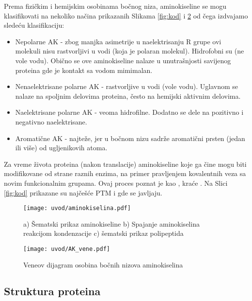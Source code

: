 Prema fizičkim i hemijskim osobinama bočnog niza, aminokiseline se mogu
klasifikovati na nekoliko načina prikazanih Slikama \ref{fig:kod} i
\ref{fig:AK_vene} od čega izdvajamo sledeću klasifikaciju:
\begin{itemize}
  \item Nepolarne AK -
    zbog manjka asimetrije u naelektrisanju R grupe ovi molekuli nisu
    rastvorljivi u vodi (koja je polaran molekul). Hidrofobni su (ne vole
    vodu).  Obično se ove aminokiseline nalaze u unutrašnjosti savijenog proteina gde
    je kontakt sa vodom mimimalan.
    
  \item Nenaelektrisane polarne AK -
    rastvorljive u vodi (vole vodu). Uglavnom se nalaze na spoljnim
    delovima proteina, često na hemijski aktivnim delovima.

  \item Naelektrisane polarne AK -
    veoma hidrofilne. Dodatno se dele na pozitivno i negativno naelektrisane.

  \item Aromatične AK - najteže, jer u bočnom nizu sadrže 
    aromatični prsten (jedan ili više) od ugljenikovih atoma.
\end{itemize}

Za vreme života proteina (nakon translacije) aminokiseline koje ga čine mogu
biti modifikovane od strane raznih enzima, na primer pravljenjem kovalentnih
veza sa novim funkcionalnim grupama. Ovaj proces poznat je kao
, kraće .  Na Slici
\ref{fig:kod} prikazane su najčešće PTM i gde se javljaju.

\begin{figure}[th]
\centering
\texttt{[image: uvod/aminokiselina.pdf]}
\caption {a) Šematski prikaz aminokiseline
b) Spajanje aminokiselina reakcijom kondenzacije
c) šematski prikaz polipeptida
}
\label{fig:AK}
\end{figure}


\begin{figure}[th]
\centering
\texttt{[image: uvod/AK\_vene.pdf]}
\caption {Veneov dijagram osobina bočnih nizova aminokiselina}
\label{fig:AK_vene}
\end{figure}

\clearpage


\subsection{Struktura proteina}

